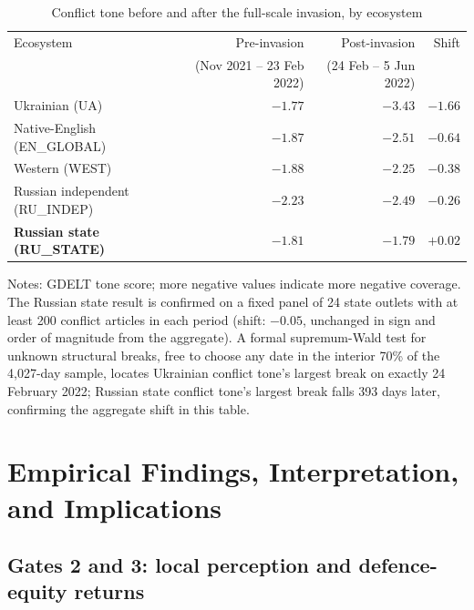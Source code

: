 \documentclass[12pt,a4paper]{article}
\begin{document}
\begin{table}[H]
\centering
\caption{Conflict tone before and after the full-scale invasion, by ecosystem}
\label{tab:invasion_tone}
\begin{threeparttable}
\begin{tabular}{lrrr}
\toprule
Ecosystem & Pre-invasion & Post-invasion & Shift \\
 & (Nov 2021 -- 23 Feb 2022) & (24 Feb -- 5 Jun 2022) & \\
\midrule
Ukrainian (UA) & $-1.77$ & $-3.43$ & $\mathbf{-1.66}$ \\
Native-English (EN\_GLOBAL) & $-1.87$ & $-2.51$ & $-0.64$ \\
Western (WEST) & $-1.88$ & $-2.25$ & $-0.38$ \\
Russian independent (RU\_INDEP) & $-2.23$ & $-2.49$ & $-0.26$ \\
\textbf{Russian state (RU\_STATE)} & $\mathbf{-1.81}$ & $\mathbf{-1.79}$ & $\mathbf{+0.02}$ \\
\bottomrule
\end{tabular}
\begin{tablenotes}
\small
\item Notes: GDELT tone score; more negative values indicate more negative coverage. The Russian state result is confirmed on a fixed panel of 24 state outlets with at least 200 conflict articles in each period (shift: $-0.05$, unchanged in sign and order of magnitude from the aggregate). A formal supremum-Wald test for unknown structural breaks, free to choose any date in the interior 70\% of the 4,027-day sample, locates Ukrainian conflict tone's largest break on exactly 24 February 2022; Russian state conflict tone's largest break falls 393 days later, confirming the aggregate shift in this table.
\end{tablenotes}
\end{threeparttable}
\end{table}

\section{Empirical Findings, Interpretation, and Implications}
\label{sec:findings}

\subsection{Gates 2 and 3: local perception and defence-equity returns}
\label{sec:gate3}
\end{document}
